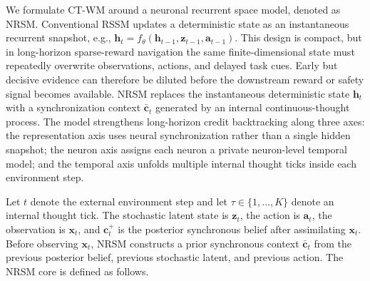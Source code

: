 \documentclass{article}
\begin{document}
We formulate CT-WM around a neuronal recurrent space model, denoted as NRSM. Conventional RSSM updates a deterministic state as an instantaneous recurrent snapshot, e.g., $\mathbf h_t=f_\theta(\mathbf h_{t-1},\mathbf z_{t-1},\mathbf a_{t-1})$. This design is compact, but in long-horizon sparse-reward navigation the same finite-dimensional state must repeatedly overwrite observations, actions, and delayed task cues. Early but decisive evidence can therefore be diluted before the downstream reward or safety signal becomes available. NRSM replaces the instantaneous deterministic state $\mathbf h_t$ with a synchronization context $\bar{\mathbf c}_t$ generated by an internal continuous-thought process. The model strengthens long-horizon credit backtracking along three axes: the representation axis uses neural synchronization rather than a single hidden snapshot; the neuron axis assigns each neuron a private neuron-level temporal model; and the temporal axis unfolds multiple internal thought ticks inside each environment step.

Let $t$ denote the external environment step and let $\tau \in \{1,\ldots,K\}$ denote an internal thought tick. The stochastic latent state is $\mathbf z_t$, the action is $\mathbf a_t$, the observation is $\mathbf x_t$, and $\mathbf c_t^+$ is the posterior synchronous belief after assimilating $\mathbf x_t$. Before observing $\mathbf x_t$, NRSM constructs a prior synchronous context $\bar{\mathbf c}_t$ from the previous posterior belief, previous stochastic latent, and previous action. The NRSM core is defined as follows.
\end{document}
